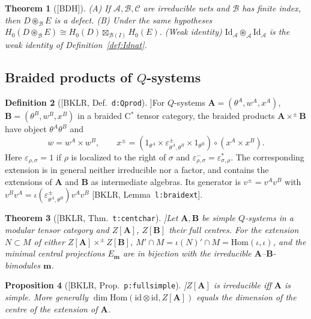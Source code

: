 \documentclass[11pt]{article}
\newtheorem{theorem}{Theorem}[section]
\newtheorem{proposition}[theorem]{Proposition}
\theoremstyle{definition}
\newtheorem{definition}[theorem]{Definition}
\theoremstyle{remark}
\newcommand{\cA}{\mathcal A}
\newcommand{\cB}{\mathcal B}
\newcommand{\cC}{\mathcal C}
\newcommand{\bfB}{\mathbf B}
\newcommand{\bfA}{\mathbf A}
\newcommand{\fus}{\boxtimes}
\newcommand{\cfus}{\circledast}
\newcommand{\Id}{\mathrm{Id}}
\begin{document}
\begin{theorem}[{[BDH]}]\label{thm:BDHfus}
(A) If $\cA,\cB,\cC$ are irreducible nets and $\cB$ has finite index, then $D\cfus_\cB E$ is a defect. (B) Under the same hypotheses $H_0(D\cfus_\cB E)\cong H_0(D)\fus_{\cB(I)}H_0(E)$. (Weak identity) $\Id_\cA\cfus_\cA\Id_\cA$ is the weak identity of Definition~\ref{def:Idnat}.
\end{theorem}

\subsection{Braided products of $Q$-systems}\label{sec:braided}
\begin{definition}[{[BKLR, Def.~\texttt{d:Qprod}}]]\label{def:braidedprod}
For $Q$-systems $\bfA=(\theta^A,w^A,x^A)$, $\bfB=(\theta^B,w^B,x^B)$ in a braided C$^*$ tensor category, the braided products $\bfA\times^\pm\bfB$ have object $\theta^A\theta^B$ and
\[
w=w^A\times w^B,\qquad x^\pm=(1_{\theta^A}\times\varepsilon^\pm_{\theta^A,\theta^B}\times1_{\theta^B})\circ(x^A\times x^B).
\]
Here $\varepsilon_{\rho,\sigma}=1$ if $\rho$ is localized to the right of $\sigma$ and $\varepsilon^-_{\rho,\sigma}=\varepsilon_{\sigma,\rho}^*$. The corresponding extension is in general neither irreducible nor a factor, and contains the extensions of $\bfA$ and $\bfB$ as intermediate algebras. Its generator is $v^\pm=v^Av^B$ with $v^Bv^A=\iota(\varepsilon^\pm_{\theta^A,\theta^B})v^Av^B$ [BKLR, Lemma~\texttt{l:braidext}].
\end{definition}

\begin{theorem}[{[BKLR, Thm.~\texttt{t:centchar}}]]\label{thm:centchar}
Let $\bfA,\bfB$ be simple $Q$-systems in a modular tensor category and $Z[\bfA]$, $Z[\bfB]$ their full centres. For the extension $N\subset M$ of either $Z[\bfA]\times^\pm Z[\bfB]$, $M'\cap M=\iota(N)'\cap M=\mathrm{Hom}(\iota,\iota)$, and the minimal central projections $E_{\mathbf m}$ are in bijection with the irreducible $\bfA$--$\bfB$-bimodules $\mathbf m$.
\end{theorem}

\begin{proposition}[{[BKLR, Prop.~\texttt{p:fullsimple}}]]\label{prop:fullsimple}
$Z[\bfA]$ is irreducible iff $\bfA$ is simple. More generally $\dim\mathrm{Hom}(\mathrm{id}\otimes\mathrm{id},Z[\bfA])$ equals the dimension of the centre of the extension of $\bfA$.
\end{proposition}
\end{document}
